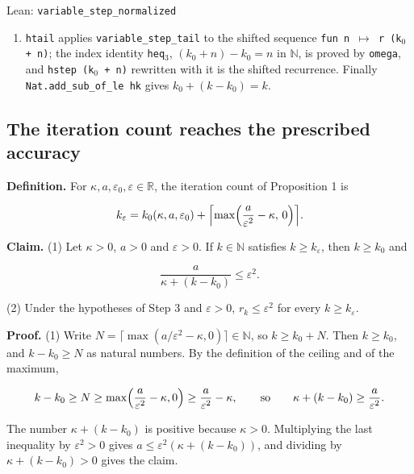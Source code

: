 \documentclass[11pt,a4paper]{report}
\begin{document}
\begin{leanbox}{Lean: \texttt{variable\_\allowbreak{}step\_\allowbreak{}normalized}}
\begin{enumerate}
\item \texttt{htail} applies \texttt{variable\_\allowbreak{}step\_\allowbreak{}tail} to the shifted sequence \texttt{fun n \ensuremath{\mapsto} r (k\ensuremath{{}_{0}} + n)}; the index identity \texttt{heq\ensuremath{{}_{3}}}, \((k_0+n)-k_0=n\) in \(\mathbb N\), is proved by \texttt{omega}, and \texttt{hstep (k\ensuremath{{}_{0}} + n)} rewritten with it is the shifted recurrence. Finally \texttt{Nat.\allowbreak{}add\_\allowbreak{}sub\_\allowbreak{}of\_\allowbreak{}le hk} gives \(k_0+(k-k_0)=k\).

\end{enumerate}
\end{leanbox}
\subsection{\texorpdfstring{The iteration count reaches the prescribed accuracy}{The iteration count reaches the prescribed accuracy}}
\label{report-step-AverageLMC-Complexity-lean-4}


\textbf{Definition.} For \(\kappa,a,\varepsilon_0,\varepsilon\in\mathbb R\), the iteration count of Proposition 1 is


\[k_\varepsilon=k_0(\kappa,a,\varepsilon_0)+\Bigl\lceil\max\Bigl(\frac a{\varepsilon^2}-\kappa,\,0\Bigr)\Bigr\rceil.\]


\textbf{Claim.} (1) Let \(\kappa>0\), \(a>0\) and \(\varepsilon>0\). If \(k\in\mathbb N\) satisfies \(k\ge k_\varepsilon\), then \(k\ge k_0\) and


\[\frac a{\kappa+(k-k_0)}\le\varepsilon^2.\]


(2) Under the hypotheses of Step 3 and \(\varepsilon>0\), \(r_k\le\varepsilon^2\) for every \(k\ge k_\varepsilon\).




\textbf{Proof.} (1) Write \(N=\lceil\max(a/\varepsilon^2-\kappa,0)\rceil\in\mathbb N\), so \(k\ge k_0+N\). Then \(k\ge k_0\), and \(k-k_0\ge N\) as natural numbers. By the definition of the ceiling and of the maximum,


\[k-k_0\ge N\ge\max\Bigl(\frac a{\varepsilon^2}-\kappa,0\Bigr)\ge\frac a{\varepsilon^2}-\kappa,\qquad\text{so}\qquad\kappa+(k-k_0)\ge\frac a{\varepsilon^2}.\]


The number \(\kappa+(k-k_0)\) is positive because \(\kappa>0\). Multiplying the last inequality by \(\varepsilon^2>0\) gives \(a\le\varepsilon^2(\kappa+(k-k_0))\), and dividing by \(\kappa+(k-k_0)>0\) gives the claim.
\end{document}
